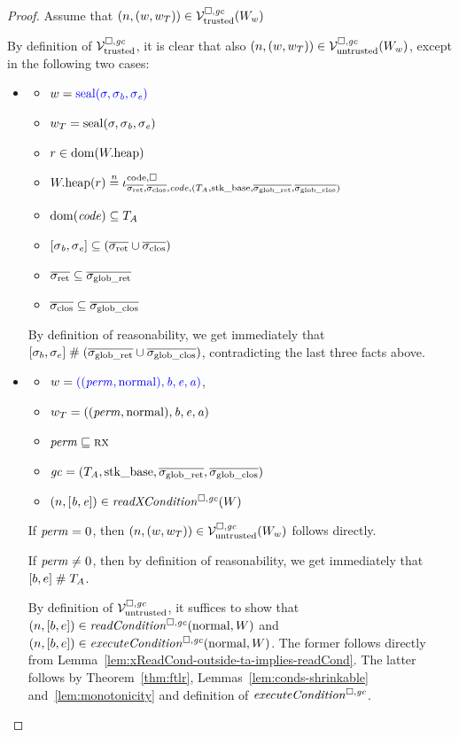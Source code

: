 \documentclass[a4paper]{article}
\begin{document}
\begin{proof}
  Assume that $\left(n,(w,w_T)\right) \in \mathcal{V}^{\square,\mathit{gc}}_{\mathrm{trusted}}(W_w)$

  By definition of $\mathcal{V}^{\square,\mathit{gc}}_{\mathrm{trusted}}$, it is clear that also $\left(n,(w,w_T)\right) \in \mathcal{V}^{\square,\mathit{gc}}_{\mathrm{untrusted}}(W_w)$, except in the following two cases:
  \begin{itemize}
  \item
    \begin{itemize}
    \item $w = {\color{blue} \mathrm{seal}(\sigma,\sigma_{\mathit{b}},\sigma_{\mathit{e}})}$
    \item $w_T = \mathrm{seal}(\sigma,\sigma_{\mathit{b}},\sigma_{\mathit{e}})$ 
    \item $r \in \mathrm{dom}(W.\mathrm{heap})$
    \item $\pwheap(r) \nequal \codereg{\sigrets,\sigcloss,\code,(\ta,\stkb,\gsigrets,\gsigcloss)}$
    \item $\mathrm{dom}(\mathit{code}) \subseteq T_{A}$ 
    \item $[\sigma_\baddr,\sigma_\eaddr] \subseteq (\sigrets\cup\sigcloss)$ 
    \item $\sigrets \subseteq \gsigrets$
    \item $\sigcloss \subseteq \gsigcloss$
    \end{itemize}

    By definition of reasonability, we get immediately that $[\sigma_b,\sigma_e]\mathrel{\#} (\overline{\sigma_{\mathrm{glob\_ret}}}\cup \overline{\sigma_{\mathrm{glob\_clos}}})$, contradicting the last three facts above.
  \item 
    \begin{itemize}
    \item $w = {\color{blue} ((\mathit{perm},\mathrm{normal}),\mathit{b},\mathit{e},\mathit{a})}$, 
    \item $w_T =
      ((\mathit{perm},\mathrm{normal}),\mathit{b},\mathit{e},\mathit{a})$
    \item $\mathit{perm} \sqsubseteq \textsc{rx}$
    \item $\mathit{gc} = (T_{A},\mathrm{stk\_base},\overline{\sigma_{\mathrm{glob\_ret}}},\overline{\sigma_{\mathrm{glob\_clos}}})$
    \item $\npair{[\baddr,\eaddr]} \in \xReadCond[\square,\gc]{W}$
    \end{itemize}

    If $\mathit{perm} = \textsc{0}$, then $\left(n,(w,w_T)\right) \in \mathcal{V}^{\square,\mathit{gc}}_{\mathrm{untrusted}}(W_w)$ follows directly.
    
    If $\mathit{perm} \neq \textsc{0}$, then by definition of reasonability, we get immediately that $[b,e] \mathrel{\#} T_{A}$.

    By definition of $\mathcal{V}^{\square,\mathit{gc}}_{\mathrm{untrusted}}$, it suffices to show that $\npair{[b,e]} \in \readCond{\normal,W}$ and $\npair{[b,e]} \in \execCond{\normal,W}$.
    The former follows directly from Lemma~\ref{lem:xReadCond-outside-ta-implies-readCond}.
    The latter follows by Theorem~\ref{thm:ftlr}, Lemmas~\ref{lem:conds-shrinkable} and~\ref{lem:monotonicity} and definition of $\execCond{}$.
  \end{itemize}
\end{proof}
\end{document}
